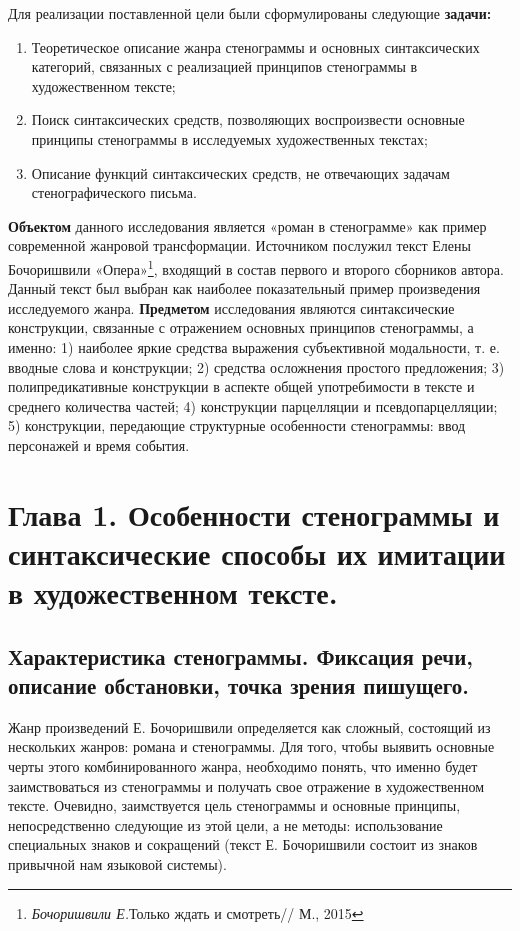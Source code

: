 \documentclass{kursa4}
\begin{document}
    {Для реализации поставленной цели были сформулированы следующие \textbf{задачи:}
    
    \begin{enumerate}
      \item Теоретическое описание жанра стенограммы и
      основных синтаксических категорий, связанных с реализацией принципов
      стенограммы в художественном тексте;
      \item Поиск синтаксических средств, позволяющих
      воспроизвести основные принципы стенограммы в исследуемых
      художественных текстах;
      \item Описание функций синтаксических средств, не
      отвечающих задачам стенографического письма.
    \end{enumerate}

    \textbf{Объектом} данного исследования является «роман в
    стенограмме» как пример современной жанровой трансформации. Источником
    послужил текст Елены Бочоришвили «Опера»\footnote{\textit{Бочоришвили Е.}{Только
    ждать и смотреть// М., 2015}}, входящий в состав первого и второго сборников автора. Данный текст был выбран как наиболее показательный пример произведения исследуемого жанра. 
    \textbf{Предметом} исследования являются синтаксические конструкции, связанные с отражением основных принципов стенограммы, а именно: 1) наиболее яркие средства выражения субъективной модальности, т. е. вводные слова и конструкции; 2) средства осложнения простого предложения; 3)  полипредикативные конструкции в аспекте общей употребимости в тексте и среднего количества частей; 4) конструкции парцелляции и псевдопарцелляции; 5) конструкции, передающие структурные особенности стенограммы: ввод персонажей и время события. 

  \setcounter{chapter}{0}
  \chapter {Глава 1. Особенности стенограммы и
  синтаксические способы их имитации в художественном тексте.}

    \section {Характеристика стенограммы. Фиксация
    речи, описание обстановки, точка зрения пишущего.}

      Жанр произведений Е. Бочоришвили определяется как сложный, состоящий
      из нескольких жанров: романа и стенограммы. Для того, чтобы выявить
      основные черты этого комбинированного жанра, необходимо понять, что
      именно будет заимствоваться из стенограммы и получать свое отражение в
      художественном тексте. Очевидно, заимствуется цель стенограммы и
      основные принципы, непосредственно следующие из этой цели, а не методы:
      использование специальных знаков и сокращений (текст Е. Бочоришвили
      состоит из знаков привычной нам языковой системы). 

}
\end{document}
